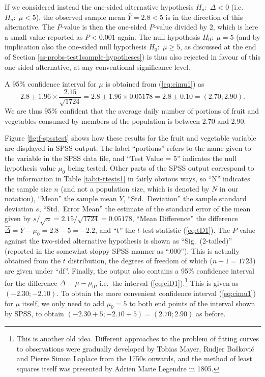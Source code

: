 \documentclass[11pt,a4paper,openany]{book}
\let\rmarkdownfootnote\footnote%
\def\footnote{\protect\rmarkdownfootnote}
\begin{document}
If we considered instead the one-sided alternative hypothesis
\(H_{a}:\;\Delta<0\) (i.e.~\(H_{a}: \; \mu<5\)), the observed sample
mean \(\bar{Y}=2.8<5\) is in the direction of this alternative. The
\(P\)-value is then the one-sided \(P\)-value divided by 2, which is
here a small value reported as \(P<0.001\) again. The null hypothesis
\(H_{0}: \; \mu=5\) (and by implication also the one-sided null
hypothesis \(H_{0}:\; \mu\ge 5\), as discussed at the end of Section
\ref{ss-probs-test1sample-hypotheses}) is thus also rejected in favour
of this one-sided alternative, at any conventional significance level.

A 95\% confidence interval for \(\mu\) is obtained from (\ref{eq:cimu1})
as \[2.8\pm 1.96 \times \frac{2.15}{\sqrt{1724}}
=2.8\pm 1.96 \times 0.05178=
2.8\pm 0.10 = (2.70; 2.90).\] We are thus 95\% confident that the
average daily number of portions of fruit and vegetables consumed by
members of the population is between 2.70 and 2.90.

Figure \ref{fig:f-spsstest} shows how these results for the fruit and
vegetable variable are displayed in SPSS output. The label ``portions''
refers to the name given to the variable in the SPSS data file, and
``Test Value = 5'' indicates the null hypothesis value \(\mu_{0}\) being
tested. \label{p-ttest-expl}Other parts of the SPSS output correspond to
the information in Table \ref{tab:t-ttests1} in fairly obvious ways, so
``N'' indicates the sample size \(n\) (and not a population size, which
is denoted by \(N\) in our notation), ``Mean'' the sample mean
\(\bar{Y}\), ``Std.~Deviation'' the sample standard deviation \(s\),
``Std.~Error Mean'' the estimate of the standard error of the mean given
by \(s/\sqrt{n}=2.15/\sqrt{1724}=0.05178\), ``Mean Difference'' the
difference \(\hat{\Delta}=\bar{Y}-\mu_{0}=2.8-5=-2.2\), and ``t'' the
\(t\)-test statistic (\ref{eq:tD1}). The \(P\)-value against the
two-sided alternative hypothesis is shown as ``Sig.~(2-tailed)''
(reported in the somewhat sloppy SPSS manner as ``.000''). This is
actually obtained from the \(t\) distribution, the degrees of freedom of
which (\(n-1=1723\)) are given under ``df''. Finally, the output also
contains a 95\% confidence interval for the difference
\(\Delta=\mu-\mu_{0}\), i.e.~the interval (\ref{eq:ciD1}).\footnote{This
  is another old idea. Different approaches to the problem of fitting
  curves to observations were gradually developed by Tobias Mayer,
  Rudjer Bošković and Pierre Simon Laplace from the 1750s onwards, and
  the method of least squares itself was presented by Adrien Marie
  Legendre in 1805.} This is given as \((-2.30; -2.10)\). To obtain the
more convenient confidence interval (\ref{eq:cimu1}) for \(\mu\) itself,
we only need to add \(\mu_{0}=5\) to both end points of the interval
shown by SPSS, to obtain \((-2.30+5; -2.10+5)=(2.70; 2.90)\) as before.
\end{document}
